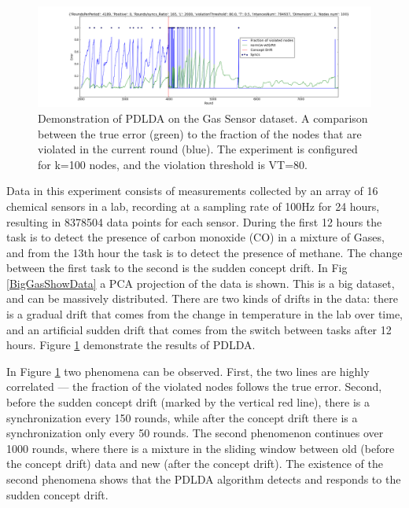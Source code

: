 \documentclass{sig-alternate-05-2015}
\begin{document}
\begin{figure}[ht!]
\centering
\includegraphics[width=\textwidth]{BigGas/overTime100k.png}
\caption{Demonstration of PDLDA on the Gas Sensor dataset.
A comparison between the true error (green) to the fraction of the nodes that
are violated in the current round (blue).
The experiment is configured for k=100 nodes, and the violation threshold is
VT=80.}
\label{BigGasOverTime}
\end{figure}
Data in this experiment \cite{bigGas} consists of measurements collected
by an array of 16 chemical sensors in a lab, recording at a sampling
rate of 100Hz for 24 hours, resulting in 8378504 data points for each sensor.
During the first 12 hours the task is to detect the presence of carbon monoxide
(CO) in a mixture of Gases, and from the 13th hour the task is to detect the presence of methane.
The change between the first task to the second is the sudden concept drift.
In Fig \ref{BigGasShowData} a PCA projection of the data is shown.
This is a big dataset, and can be massively distributed.
There are two kinds of drifts in the data: there is a gradual drift that comes from
the change in temperature in the lab over time, and an
artificial sudden drift that comes from the switch between tasks after 12 hours.
Figure \ref{BigGasOverTime} demonstrate the results of PDLDA.

In Figure \ref{BigGasOverTime} two phenomena can be observed.
First, the two lines are highly correlated --- the fraction of the violated
nodes follows the true error. Second,  before the sudden concept drift
(marked by the vertical red line), there is a synchronization every 150 rounds, while
after the concept drift there is a synchronization only every 50 rounds.
The second phenomenon continues over 1000 rounds, where there is a mixture in the
sliding window between old (before the concept drift) data and new
(after the concept drift). The existence of the second phenomena shows that
the PDLDA algorithm detects and responds to the sudden concept drift.
\end{document}
